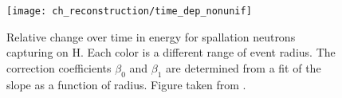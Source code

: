 \begin{figure}
    \centering
    \texttt{[image: ch\_reconstruction/time\_dep\_nonunif]}
    \caption{
        Relative change over time in energy for spallation neutrons capturing on H.
        Each color is a different range of event radius.
        The correction coefficients $\beta_0$ and $\beta_1$ are determined
        from a fit of the slope as a function of radius.
        Figure taken from \cite{nonuniformity4}.
    }
    \label{fig:time_dep_nonunif}
\end{figure}
